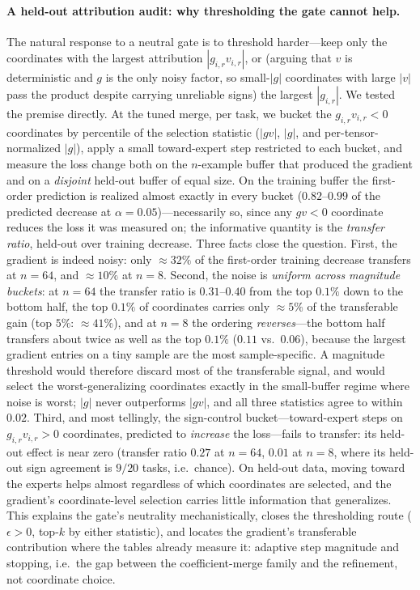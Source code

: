 \documentclass[11pt]{article}
\begin{document}
\paragraph{A held-out attribution audit: why thresholding the gate cannot help.}
The natural response to a neutral gate is to threshold harder---keep only the coordinates with the largest attribution $|g_{i,r}v_{i,r}|$, or (arguing that $v$ is deterministic and $g$ is the only noisy factor, so small-$|g|$ coordinates with large $|v|$ pass the product despite carrying unreliable signs) the largest $|g_{i,r}|$. We tested the premise directly. At the tuned merge, per task, we bucket the $g_{i,r}v_{i,r}<0$ coordinates by percentile of the selection statistic ($|gv|$, $|g|$, and per-tensor-normalized $|g|$), apply a small toward-expert step restricted to each bucket, and measure the loss change both on the $n$-example buffer that produced the gradient and on a \emph{disjoint} held-out buffer of equal size. On the training buffer the first-order prediction is realized almost exactly in every bucket ($0.82$--$0.99$ of the predicted decrease at $\alpha=0.05$)---necessarily so, since any $gv<0$ coordinate reduces the loss it was measured on; the informative quantity is the \emph{transfer ratio}, held-out over training decrease. Three facts close the question. First, the gradient is indeed noisy: only ${\approx}32\%$ of the first-order training decrease transfers at $n=64$, and ${\approx}10\%$ at $n=8$. Second, the noise is \emph{uniform across magnitude buckets}: at $n=64$ the transfer ratio is $0.31$--$0.40$ from the top $0.1\%$ down to the bottom half, the top $0.1\%$ of coordinates carries only ${\approx}5\%$ of the transferable gain (top $5\%$: ${\approx}41\%$), and at $n=8$ the ordering \emph{reverses}---the bottom half transfers about twice as well as the top $0.1\%$ ($0.11$ vs.\ $0.06$), because the largest gradient entries on a tiny sample are the most sample-specific. A magnitude threshold would therefore discard most of the transferable signal, and would select the worst-generalizing coordinates exactly in the small-buffer regime where noise is worst; $|g|$ never outperforms $|gv|$, and all three statistics agree to within $0.02$. Third, and most tellingly, the sign-control bucket---toward-expert steps on $g_{i,r}v_{i,r}>0$ coordinates, predicted to \emph{increase} the loss---fails to transfer: its held-out effect is near zero (transfer ratio $0.27$ at $n=64$, $0.01$ at $n=8$, where its held-out sign agreement is $9/20$ tasks, i.e.\ chance). On held-out data, moving toward the experts helps almost regardless of which coordinates are selected, and the gradient's coordinate-level selection carries little information that generalizes. This explains the gate's neutrality mechanistically, closes the thresholding route ($\epsilon>0$, top-$k$ by either statistic), and locates the gradient's transferable contribution where the tables already measure it: adaptive step magnitude and stopping, i.e.\ the gap between the coefficient-merge family and the refinement, not coordinate choice.
\end{document}
